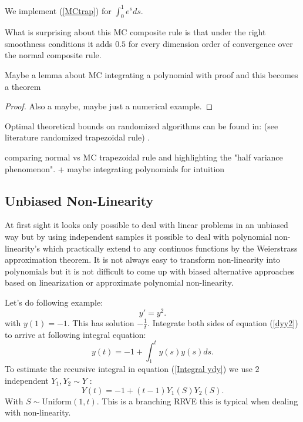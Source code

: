 \documentclass[a4paper,12pt]{article}
\begin{document}
\begin{pythonn}
    We implement (\ref{MCtrap}) for $\int_{0}^{1}e^{s}ds$.
    \vspace*{0.5cm}
\end{pythonn}

What is surprising about this MC composite rule is that
under the right smoothness conditions it adds $0.5$
for every dimension order of convergence over the normal
composite rule.

\begin{lemma}
    Maybe a lemma about MC integrating a polynomial
    with proof and this becomes a theorem
\end{lemma}

\begin{proof}
    Also a maybe, maybe just a numerical example.
\end{proof}

\begin{related}
    Optimal theoretical bounds on randomized algorithms can be found in:
    (see literature randomized trapezoidal rule)
    \cite{wu_randomised_2020}.
\end{related}

comparing normal vs MC trapezoidal rule and highlighting the "half variance phenomenon".
+ maybe integrating polynomials for intuition

\subsection{Unbiased Non-Linearity}
At first sight it looks only possible to deal with linear problems in an unbiased way but by using
independent samples it possible to deal with polynomial non-linearity's which practically extend
to any continuos functions by the Weierstrass approximation theorem.  It is not always easy to
transform non-linearity into polynomials but it is not difficult to come up with
biased alternative approaches based on linearization or approximate polynomial non-linearity.


\begin{example}[$y'=y^{2}$]
    Let's do following example:
    \begin{equation} \label{dyy2}
        y'= y^2.
    \end{equation}
    with $y(1)=-1$. This has solution $-\frac{1}{t}$. Integrate both sides of
    equation (\ref{dyy2}) to arrive at following integral equation:
    \begin{equation} \label{Integral dyy2}
        y(t) = -1 + \int_{1}^{t} y(s) y(s) ds .
    \end{equation}
    To estimate the recursive integral in equation (\ref{Integral ydy}) we use $2$
    independent $Y_{1},Y_{2}\sim Y$ :
    \[
        Y(t) = -1 + (t-1) Y_{1}(S) Y_{2}(S)
        .\]
    With $S \sim \text{Uniform}(1,t)$. This is a branching RRVE this is
    typical when dealing with non-linearity.
\end{example}
\end{document}

